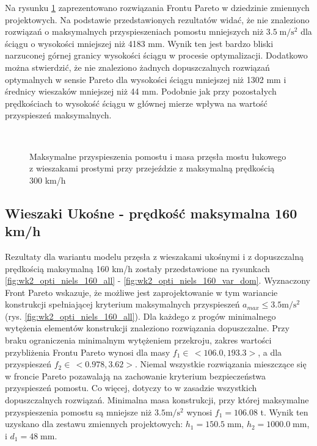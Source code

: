 Na rysunku \ref{fig:wk2_opti_proste_300_var_dom} zaprezentowano rozwiązania Frontu Pareto w dziedzinie zmiennych projektowych. Na podstawie przedstawionych rezultatów widać, że nie znaleziono rozwiązań o maksymalnych przyspieszeniach pomostu mniejszych niż $3.5\;\mathrm{m/s^2}$ dla ściągu o wysokości mniejszej niż 4183 mm. Wynik ten jest bardzo bliski narzuconej górnej granicy wysokości ściągu w procesie optymalizacji. Dodatkowo można stwierdzić, że nie znaleziono żadnych dopuszczalnych rozwiązań optymalnych w sensie Pareto dla wysokości ściągu mniejszej niż 1302 mm i średnicy wieszaków mniejszej niż 44 mm. Podobnie jak przy pozostałych prędkościach to wysokość ściągu w głównej mierze wpływa na wartość przyspieszeń maksymalnych.

\begin{figure}[hbt!]
	\centering
	\\
	\captionsetup{justification=centering}
	\caption{Maksymalne przyspieszenia pomostu i masa przęsła mostu łukowego z wieszakami prostymi przy przejeździe z maksymalną prędkością 300 km/h}
	\label{fig:wk2_opti_proste_300_var_dom}
\end{figure}





\pagebreak[4]
\subsection{Wieszaki Ukośne - prędkość maksymalna 160 km/h}

Rezultaty dla wariantu modelu przęsła z wieszakami ukośnymi i z dopuszczalną prędkością maksymalną 160 km/h zostały przedstawione na rysunkach \ref{fig:wk2_opti_niels_160_all} - \ref{fig:wk2_opti_niels_160_var_dom}. Wyznaczony Front Pareto wskazuje, że możliwe jest zaprojektowanie w tym wariancie konstrukcji spełniającej kryterium maksymalnych przyspieszeń $a_{max}\le 3.5 \mathrm{m/s^2}$ (rys. \ref{fig:wk2_opti_niels_160_all}). Dla każdego z progów minimalnego wytężenia elementów konstrukcji znaleziono rozwiązania dopuszczalne. Przy braku ograniczenia minimalnym wytężeniem przekroju, zakres wartości przybliżenia Frontu Pareto wynosi dla masy $f_1 \in\,<106.0,193.3>$, a dla przyspieszeń $f_2 \in\,<0.978,3.62>$. Niemal wszystkie rozwiązania mieszczące się w froncie Pareto pozawalają na zachowanie kryterium bezpieczeństwa przyspieszeń pomostu. Co więcej, dotyczy to w zasadzie wszystkich dopuszczalnych rozwiązań. Minimalna masa konstrukcji, przy której maksymalne przyspieszenia pomostu są mniejsze niż $3.5 \mathrm{m/s^2}$ wynosi $f_1 = 106.08$ t. Wynik ten uzyskano dla zestawu zmiennych projektowych: $h_1 = 150.5\;\mathrm{mm}$, $h_2 = 1000.0\;\mathrm{mm}$, i $d_1 = 48\;\mathrm{mm}$.

